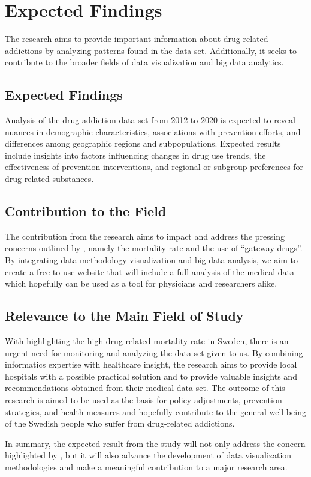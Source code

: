 \section{Expected Findings}
The research aims to provide important information about drug-related addictions by analyzing patterns found in the data set. Additionally, it seeks to contribute to the broader fields of data visualization and big data analytics. 

\subsection{Expected Findings
}
Analysis of the drug addiction data set from 2012 to 2020 is expected to reveal nuances in demographic characteristics, associations with prevention efforts, and differences among geographic regions and subpopulations. Expected results include insights into factors influencing changes in drug use trends, the effectiveness of prevention interventions, and regional or subgroup preferences for drug-related substances.


\subsection{Contribution to the Field}
The contribution from the research aims to impact and address the pressing concerns outlined by \cite{medData}, namely the mortality rate and the use of “gateway drugs”. By integrating data methodology visualization and big data analysis, we aim to create a free-to-use website that will include a full analysis of the medical data which hopefully can be used as a tool for physicians and researchers alike.

\subsection{Relevance to the Main Field of Study}
With \cite{medData} highlighting the high drug-related mortality rate in Sweden, there is an urgent need for monitoring and analyzing the data set given to us. By combining informatics expertise with healthcare insight, the research aims to provide local hospitals with a possible practical solution and to provide valuable insights and recommendations obtained from their medical data set. The outcome of this research is aimed to be used as the basis for policy adjustments, prevention strategies, and health measures and hopefully contribute to the general well-being of the Swedish people who suffer from drug-related addictions. 

In summary, the expected result from the study will not only address the concern highlighted by \cite{medData}, but it will also advance the development of data visualization methodologies and make a meaningful contribution to a major research area. 


	
